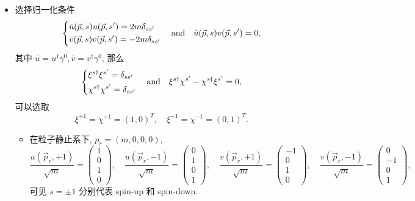 \begin{itemize}
	\item 选择归一化条件
	\begin{equation}
		\begin{dcases}
			\bar{u}(\vec{p}, s) u(\vec{p}, s') = 2 m \delta_{s s'} \\
			\bar{v}(\vec{p}, s) v(\vec{p}, s') = - 2 m \delta_{s s'}
		\end{dcases} \quad \text{and} \quad \bar{u}(\vec{p}, s) v(\vec{p}, s') = 0,
	\end{equation}
	其中 $\bar{u} = u^\dag \gamma^0, \bar{v} = v^\dag \gamma^0$, 那么
	\begin{equation}
		\begin{dcases}
			\xi^{s \dag} \xi^{s'} = \delta_{s s'} \\
			\chi^{s \dag} \chi^{s'} = \delta_{s s'}
		\end{dcases} \quad \text{and} \quad \xi^{s \dag} \chi^{s'} - \chi^{s \dag} \xi^{s'} = 0,
	\end{equation}
	可以选取
	\begin{equation}
		\xi^{+ 1} = \chi^{+ 1} = (1, 0)^T, \quad \xi^{- 1} = \chi^{- 1} = (0, 1)^T.
	\end{equation}
	\begin{itemize}
		\item 在粒子静止系下, $p_r = (m, 0, 0, 0)$,
		\begin{equation}
			\frac{u(\vec{p}_r, + 1)}{\sqrt{m}} = \begin{pmatrix}
				1 \\
				0 \\
				1 \\
				0
			\end{pmatrix}, \quad \frac{u(\vec{p}_r, - 1)}{\sqrt{m}} = \begin{pmatrix}
				0 \\
				1 \\
				0 \\
				1
			\end{pmatrix}, \quad \frac{v(\vec{p}_r, + 1)}{\sqrt{m}} = \begin{pmatrix}
				- 1 \\
				0 \\
				1 \\
				0
			\end{pmatrix}, \quad \frac{v(\vec{p}_r, - 1)}{\sqrt{m}} = \begin{pmatrix}
				0 \\
				- 1 \\
				0 \\
				1
			\end{pmatrix},
		\end{equation}
		可见 $s = \pm 1$ 分别代表 spin-up 和 spin-down.
		

\end{itemize}
\end{itemize}
